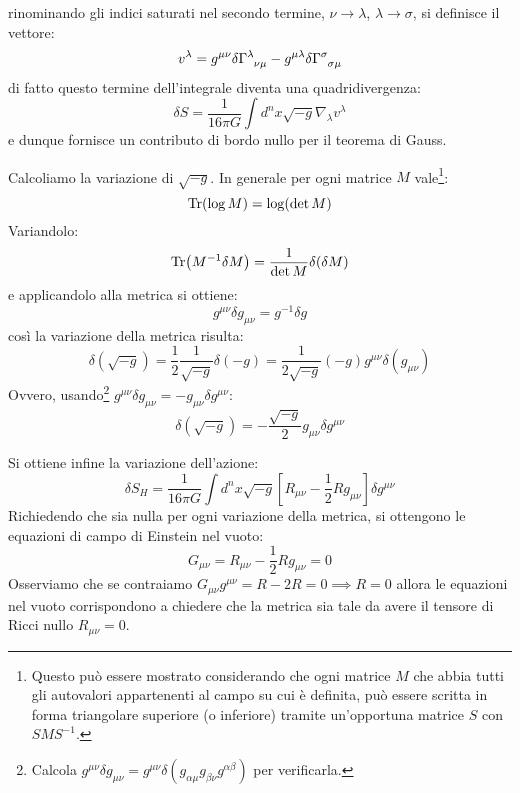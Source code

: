 rinominando gli indici saturati nel secondo termine, $\nu \rightarrow \lambda$, $\lambda \rightarrow \sigma$, si definisce il vettore:
\begin{equation*}
    v^\lambda = g^{\mu\nu} \delta \tensor{\Gamma}{^\lambda_{\nu\mu}} - g^{\mu\lambda}\delta\tensor{\Gamma}{^\sigma_{\sigma\mu}}
\end{equation*}
di fatto questo termine dell'integrale diventa una quadridivergenza:
\begin{equation*}
    \delta S = \frac{1}{16\pi G} \int d^n x \sqrt{-g}\nabla_\lambda v^\lambda
\end{equation*}
e dunque fornisce un contributo di bordo nullo per il teorema di Gauss.

Calcoliamo la variazione di $\sqrt{-g}$. In generale per ogni matrice $M$ vale\footnote{Questo può essere mostrato considerando che ogni matrice $M$ che abbia tutti gli autovalori appartenenti al campo su cui è definita, può essere scritta in forma triangolare superiore (o inferiore) tramite un'opportuna matrice $S$ con $S M S^{-1}$.}:
\begin{equation*}
    \Tr(\log M) = \log( \det M)
\end{equation*}
Variandolo:
\begin{equation*}
    \Tr(M^{-1}\delta M) = \frac{1}{\det M}\delta(\delta M)
\end{equation*}
e applicandolo alla metrica si ottiene:
\begin{equation*}
    g^{\mu\nu} \delta g_{\mu\nu} = g^{-1} \delta g
\end{equation*}
così la variazione della metrica risulta:
\begin{equation*}
    \delta(\sqrt{-g}) = \frac{1}{2}\frac{1}{\sqrt{-g}}\delta(-g) = \frac{1}{2\sqrt{-g}}(-g) g^{\mu\nu} \delta(g_{\mu\nu})
\end{equation*}
Ovvero, usando\footnote{Calcola $g^{\mu\nu}\delta g_{\mu\nu} = g^{\mu\nu} \delta(g_{\alpha\mu}g_{\beta\nu}g^{\alpha\beta})$ per verificarla.} $g^{\mu\nu}\delta g_{\mu\nu} = - g_{\mu\nu}\delta g^{\mu\nu}$:
\begin{equation}
    \delta(\sqrt{-g}) = - \frac{\sqrt{-g}}{2}g_{\mu\nu} \delta g^{\mu\nu} 
    \label{eq.variazione_determinante_metrica}
\end{equation}

Si ottiene infine la variazione dell'azione:
\begin{equation*}
    \delta S_H = \frac{1}{16\pi G} \int d^n x\sqrt{-g}\left[ R_{\mu\nu} - \frac{1}{2}Rg_{\mu\nu}\right]\delta g^{\mu\nu}
\end{equation*}
Richiedendo che sia nulla per ogni variazione della metrica, si ottengono le equazioni di campo di Einstein nel vuoto:
\begin{equation*}
    G_{\mu\nu} = R_{\mu\nu} - \frac{1}{2}Rg_{\mu\nu} = 0
\end{equation*}
Osserviamo che se contraiamo $G_{\mu\nu} g^{\mu\nu} = R -2 R = 0 \implies R = 0$ allora le equazioni nel vuoto corrispondono a chiedere che la metrica sia tale da avere il tensore di Ricci nullo $R_{\mu\nu}  = 0$. 

